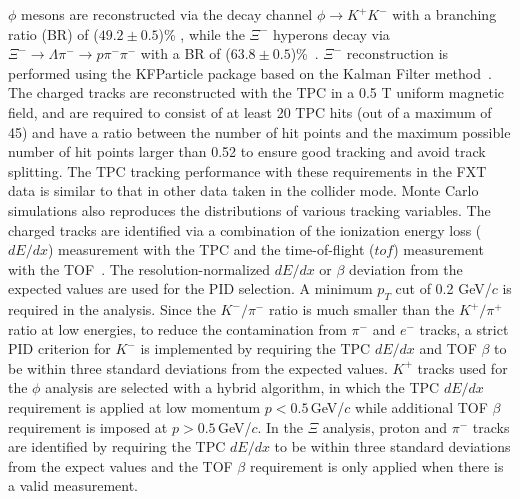 \documentclass[aps,tightenlines,superscriptaddress,twocolumn]{revtex4-1}
\begin{document}
$\phi$ mesons are reconstructed via the decay channel $\phi\rightarrow K^+K^-$ with a branching ratio (BR) of ($49.2\pm0.5$)\% , while the $\Xi^{-}$ hyperons decay via $\Xi^-\rightarrow\Lambda\pi^-\rightarrow p\pi^-\pi^-$ with a BR of ($63.8\pm0.5$)\%~\cite{pdg:2020}. $\Xi^-$ reconstruction is performed using the KFParticle package based on the Kalman Filter method~\cite{Kisel:2018nvd,Kisel:2020lpa,STAR:2021gvx,STAR_PRL_Xi_Oemga_polarization:2021}. The charged tracks are reconstructed with the TPC in a 0.5 T uniform magnetic field, and are required to consist of at least 20 TPC hits (out of a maximum of 45) and have a ratio between the number of hit points and the maximum possible number of hit points larger than 0.52 to ensure good tracking and avoid track splitting. %
The TPC tracking performance with these requirements in the FXT data is similar to that in other data taken in the collider mode. Monte Carlo simulations also reproduces the distributions of various tracking variables.
The charged tracks are identified via a combination of the ionization energy loss ($dE/dx$) measurement with the TPC and the time-of-flight ($tof$) measurement with the TOF~\cite{Shao:2005iu,Xu:2008th}. 
The resolution-normalized $dE/dx$ or $\beta$ deviation from the expected values are used for the PID selection. 
A minimum $p_T$ cut of 0.2 GeV/$c$ is required in the analysis.
Since the $K^{-}/\pi^{-}$ ratio is much smaller than the $K^{+}/\pi^{+}$ ratio at low energies, to reduce the contamination from $\pi^{-}$ and $e^{-}$ tracks, a strict PID criterion for $K^{-}$ is implemented by requiring the TPC $dE/dx$ and TOF $\beta$ to be within three standard deviations from the expected values. $K^{+}$ tracks used for the $\phi$ analysis are selected with a hybrid algorithm, in which the TPC $dE/dx$ requirement is applied at low momentum $p<0.5$\,GeV/$c$ while additional TOF $\beta$ requirement is imposed at $p>0.5$\,GeV/$c$. In the $\Xi$ analysis, proton and $\pi^-$ tracks are identified by requiring the TPC $dE/dx$ to be within three standard deviations from the expect values and the TOF $\beta$ requirement is only applied when there is a valid measurement.
\end{document}
